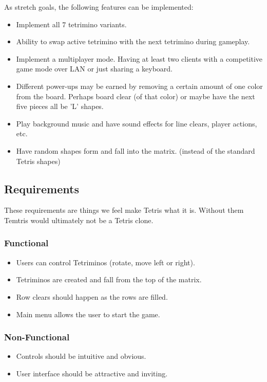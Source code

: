 \documentclass[10pt,conference,onecolumn,compsoc]{IEEEtran}
\begin{document}
As stretch goals, the following features can be implemented:
\begin{itemize}
\item Implement all 7 tetrimino variants.
\item Ability to swap active tetrimino with the next tetrimino during gameplay.
\item Implement a multiplayer mode. Having at least two clients with a competitive game mode over LAN or just sharing a keyboard.
\item Different power-ups may be earned by removing a certain amount of one color from the board. Perhaps board clear (of that color) or maybe have the next five pieces all be 'L' shapes.
\item Play background music and have sound effects for line clears, player actions, etc.
\item Have random shapes form and fall into the matrix. (instead of the standard Tetris shapes)
\end{itemize}

\subsection{Requirements}
These requirements are things we feel make Tetris what it is. Without them Temtris would ultimately not be a Tetris clone.

\subsubsection{Functional}
\begin{itemize}
\item Users can control Tetriminos (rotate, move left or right).
\item Tetriminos are created and fall from the top of the matrix.
\item Row clears should happen as the rows are filled.
\item Main menu allows the user to start the game.
\end{itemize}

\subsubsection{Non-Functional}
\begin{itemize}
\item Controls should be intuitive and obvious.
\item User interface should be attractive and inviting.
\end{itemize}
\end{document}
